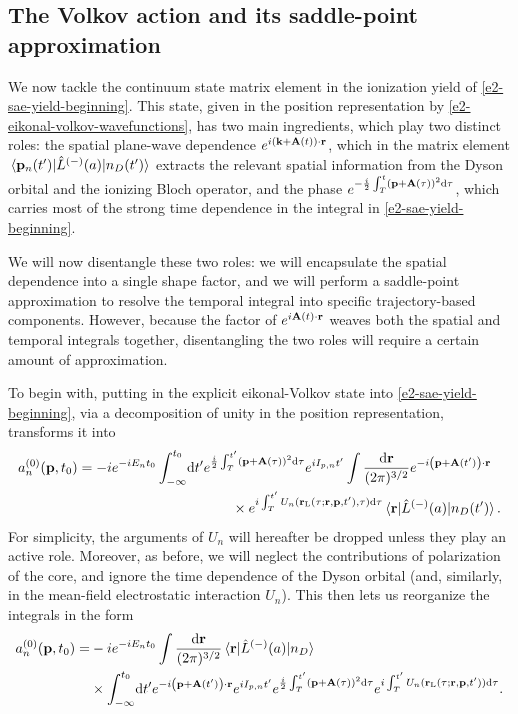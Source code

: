 \subsection{The Volkov action and its saddle-point approximation}
We now tackle the continuum state matrix element in the ionization yield of \eqref{e2-sae-yield-beginning}. This state, given in the position representation by \eqref{e2-eikonal-volkov-wavefunctions}, has two main ingredients, which play two distinct roles: the spatial plane-wave dependence $e^{i\left(\vb{k}+\vb{A}(t)\right)\cdot\vb{r}}$, which in the matrix element $\matrixel{\vb{p}_n(t')}{\hat{L}^{(-)}(a)}{n_D(t')}$ extracts the relevant spatial information from the Dyson orbital and the ionizing Bloch operator, and the phase $e^{-\frac{i}{2} \int_T^t\left(\vb{p}+\vb{A}(\tau)\right)^2\mathrm{d}\tau}$, which carries most of the strong time dependence in the integral in \eqref{e2-sae-yield-beginning}. 

We will now disentangle these two roles: we will encapsulate the spatial dependence into a single shape factor, and we will perform a saddle-point approximation to resolve the temporal integral into specific trajectory-based components. However, because the factor of $e^{i\vb{A}(t)\cdot\vb{r}}$ weaves both the spatial and temporal integrals together, disentangling the two roles will require a certain amount of approximation.

To begin with, putting in the explicit eikonal-Volkov state into \eqref{e2-sae-yield-beginning}, via a decomposition of unity in the position representation, transforms it into
\begin{align}
a_n^{(0)}(\vb{p},\tn)
=
-i e^{-iE_n\tn} 
\int_{-\infty}^{\tn}\!\d t'
&  
e^{\frac{i}{2} \int_T^{t'}\left(\vbp+\vba(\tau)\right)^2\d\tau}
e^{i I_{p,n} t'}  
\int\frac{\d\vbr}{(2\pi)^{3/2}}
e^{-i\left(\vbp+\vba(t')\right)\cdot\vb{r}} 
\nonumber \\ & \qquad \times
e^{i\int_T^{t'} U_n(\rl(\tau;\vb{r},\vbp,t'),\tau)\d\tau}
\matrixel{\vbr}{\hat{L}^{(-)}(a)}{n_D(t')}.
\end{align}
For simplicity, the arguments of $U_n$ will hereafter be dropped unless they play an active role. Moreover, as before, we will neglect the contributions of polarization of the core, and ignore the time dependence of the Dyson orbital (and, similarly, in the mean-field electrostatic interaction $U_n$). This then lets us reorganize the integrals in the form
\begin{align}
a_n^{(0)}(\vb{p},\tn)
=
&  
-i e^{-iE_n\tn} 
\int\frac{\d\vbr}{(2\pi)^{3/2}}
\matrixel{\vbr}{\hat{L}^{(-)}(a)}{n_D}
\nonumber \\ &  \times
\int_{-\infty}^{\tn}\!\d t'
e^{-i\left(\vbp+\vba(t')\right)\cdot\vb{r}} 
e^{i I_{p,n} t'}  
e^{\frac{i}{2} \int_T^{t'}\left(\vbp+\vba(\tau)\right)^2\d\tau}
e^{i\int_T^{t'} U_n(\rl(\tau;\vb{r},\vbp,t'))\d\tau}
.
\label{e2-yield-after-order-switch}
\end{align}






